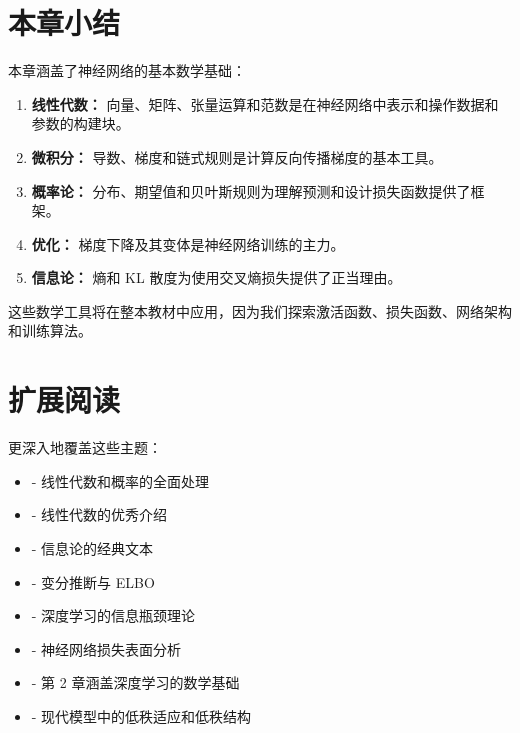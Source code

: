 \section{本章小结}

本章涵盖了神经网络的基本数学基础：

\begin{enumerate}
    \item \textbf{线性代数：} 向量、矩阵、张量运算和范数是在神经网络中表示和操作数据和参数的构建块。
    
    \item \textbf{微积分：} 导数、梯度和链式规则是计算反向传播梯度的基本工具。
    
    \item \textbf{概率论：} 分布、期望值和贝叶斯规则为理解预测和设计损失函数提供了框架。
    
    \item \textbf{优化：} 梯度下降及其变体是神经网络训练的主力。
    
    \item \textbf{信息论：} 熵和 KL 散度为使用交叉熵损失提供了正当理由。
\end{enumerate}

这些数学工具将在整本教材中应用，因为我们探索激活函数、损失函数、网络架构和训练算法。

\section{扩展阅读}

更深入地覆盖这些主题：

\begin{itemize}
    \item \cite{bishop2006pattern} - 线性代数和概率的全面处理
    \item \cite{strang2009introduction} - 线性代数的优秀介绍
    \item \cite{cover2012elements} - 信息论的经典文本
    \item \cite{kingma2013auto} - 变分推断与 ELBO
    \item \cite{tishby2015deep} - 深度学习的信息瓶颈理论
    \item \cite{choriomanska2015loss} - 神经网络损失表面分析
    \item \cite{goodfellow2016deep} - 第 2 章涵盖深度学习的数学基础
    \item \cite{hu2021lora} - 现代模型中的低秩适应和低秩结构
\end{itemize}


